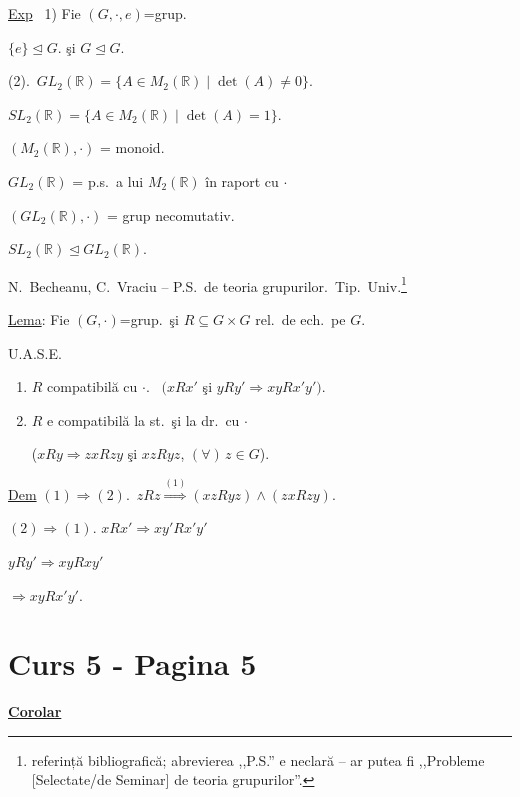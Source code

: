 \bigskip
\noindent\underline{Exp} \ 1) Fie $(G,\cdot,e)$=grup.

\noindent $\{e\}\trianglelefteq G$. \quad şi \quad $G\trianglelefteq G$.

\bigskip
\noindent (2).\ $GL_2(\mathbb{R}) = \{A\in M_2(\mathbb{R}) \mid \det(A)\neq 0\}$.

\noindent $SL_2(\mathbb{R}) = \{A\in M_2(\mathbb{R}) \mid \det(A)=1\}$.

\noindent $(M_2(\mathbb{R}),\cdot)$ = monoid.

\noindent $GL_2(\mathbb{R})$ = p.s.\ a lui $M_2(\mathbb{R})$ în raport cu $\cdot$

\noindent $(GL_2(\mathbb{R}),\cdot)$ = grup necomutativ.

\noindent $SL_2(\mathbb{R}) \trianglelefteq GL_2(\mathbb{R})$.

\bigskip
\noindent N.\ Becheanu, C.\ Vraciu -- P.S.\ de teoria grupurilor.\ Tip.\ Univ.\footnote{referință bibliografică; abrevierea ,,P.S.'' e neclară -- ar putea fi ,,Probleme [Selectate/de Seminar] de teoria grupurilor''.}

\bigskip
\noindent\underline{Lema}: Fie $(G,\cdot)$=grup.\ şi $R\subseteq G\times G$ rel.\ de ech.\ pe $G$.

\noindent U.A.S.E.

\begin{enumerate}
\item[(1)] $R$ compatibilă cu $\cdot$. \ $\big(xRx'$ şi $yRy' \Rightarrow xyRx'y'\big)$.
\item[(2)] $R$ e compatibilă la st.\ şi la dr.\ cu $\cdot$

\noindent \big($xRy \Rightarrow zxRzy$ şi $xzRyz$, $(\forall)\,z\in G$\big).
\end{enumerate}

\bigskip
\noindent\underline{Dem} $(1)\Rightarrow(2)$.\ $zRz \overset{(1)}{\Longrightarrow} (xzRyz)\wedge(zxRzy)$.

\bigskip
\noindent $(2) \Rightarrow (1)$. \quad $xRx' \Rightarrow xy'Rx'y'$

\noindent $yRy' \Rightarrow xyRxy'$

\noindent $\Rightarrow xyRx'y'$.




\section*{Curs 5 - Pagina 5}

\noindent\underline{\textbf{Corolar}}


